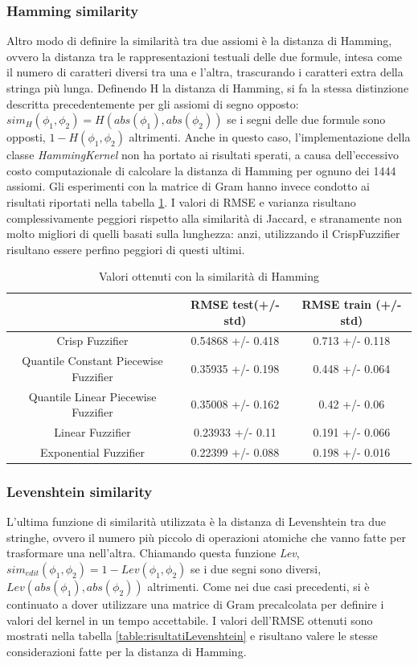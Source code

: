 \documentclass[12pt,a4paper]{report}
\begin{document}
\subsubsection{Hamming similarity}
Altro modo di definire la similarità tra due assiomi è la distanza di Hamming, ovvero la distanza tra le rappresentazioni testuali delle due formule, intesa come il numero di caratteri diversi tra una e l'altra, trascurando i caratteri extra della stringa più lunga.
Definendo H la distanza di Hamming, si fa la stessa distinzione descritta precedentemente per gli assiomi di segno opposto:  $sim_{H}(\phi_1, \phi_2) = H(abs(\phi_1),abs(\phi_2))$ se i segni delle due formule sono opposti, $1 - H(\phi_1, \phi_2)$ altrimenti.
Anche in questo caso, l'implementazione della classe \emph{HammingKernel} non ha portato ai risultati sperati, a causa dell'eccessivo costo computazionale di calcolare la distanza di Hamming per ognuno dei 1444 assiomi. Gli esperimenti con la matrice di Gram hanno invece condotto ai risultati riportati nella tabella \ref{table:risultatiHamming}. I valori di RMSE e varianza risultano complessivamente peggiori rispetto alla similarità di Jaccard, e stranamente non molto migliori di quelli basati sulla lunghezza: anzi, utilizzando il CrispFuzzifier risultano essere perfino peggiori di questi ultimi.

\begin{table}[h!]
\small
\centering 	
	\begin{tabular}{|c|c|c|} 
	 \hline
	  & RMSE test(+/- std) & RMSE train (+/- std)\\ [0.5ex] 
	 \hline
	 Crisp Fuzzifier & 0.54868 +/- 0.418 & 0.713 +/- 0.118 \\ 
	 \hline
	 Quantile Constant Piecewise Fuzzifier & 0.35935 +/- 0.198 & 0.448 +/- 0.064\\
	 \hline
	 Quantile Linear Piecewise Fuzzifier & 0.35008 +/- 0.162 & 0.42 +/- 0.06\\
	 \hline
	 Linear Fuzzifier &0.23933 +/- 0.11 & 0.191 +/- 0.066\\
	 \hline
	 Exponential Fuzzifier & 0.22399 +/- 0.088 & 0.198 +/- 0.016\\ [1ex] 
	 \hline
	\end{tabular}
	\caption{Valori ottenuti con la similarità di Hamming}
	\label{table:risultatiHamming}
\end{table}

\subsubsection{Levenshtein similarity}
L'ultima funzione di similarità utilizzata è la distanza di Levenshtein tra due stringhe, ovvero il numero più piccolo di operazioni atomiche che vanno fatte per trasformare una nell'altra. Chiamando questa funzione \emph{Lev}, $sim_{edit}(\phi_1, \phi_2) = 1 - Lev(\phi_1,\phi_2)$ se i due segni sono diversi, $Lev(abs(\phi_1),abs(\phi_2))$ altrimenti.
Come nei due casi precedenti, si è continuato a dover utilizzare una matrice di Gram precalcolata per definire i valori del kernel in un tempo accettabile. I valori dell'RMSE ottenuti sono mostrati nella tabella \ref{table:risultatiLevenshtein} e risultano valere le stesse considerazioni fatte per la distanza di Hamming.
\end{document}

